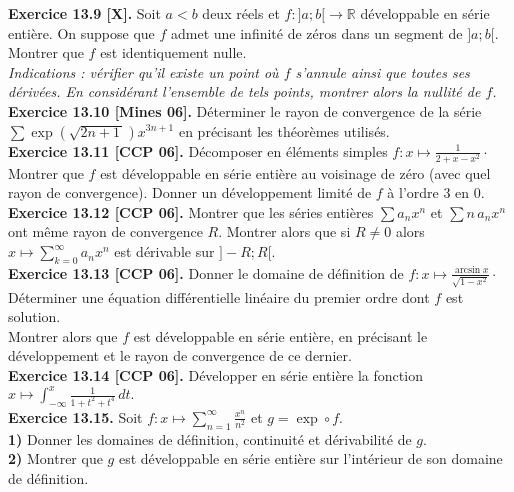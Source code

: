 \documentclass[a4paper,12pt,francais]{article}
\newcommand{\field}[1]{\mathbb{#1}}
\newcommand{\R}{\field{R}}
\begin{document}
\noindent
{\bf Exercice 13.9 [X].} Soit $a<b$ deux réels et $f:]a;b[\rightarrow \R$ développable en série entière. On suppose que $f$
      admet une infinité de zéros dans un segment de $]a;b[$. Montrer
      que $f$ est identiquement nulle.\\
{\it Indications : vérifier qu'il existe un point où $f$ s'annule
  ainsi que toutes ses dérivées. En considérant l'ensemble de tels
  points, montrer alors la nullité de $f$.}\\

\noindent
{\bf Exercice 13.10 [Mines 06].} Déterminer le rayon de convergence de
la série $\displaystyle \sum \exp(\sqrt{2n+1\,}) x^{3n+1}$ en
précisant les théorèmes utilisés.\\

\noindent
{\bf Exercice 13.11 [CCP 06].} Décomposer en éléments simples
$f:x\mapsto \frac{1}{2+x-x^2}\cdot$ Montrer que $f$ est développable
en série entière au voisinage de zéro (avec quel rayon de
convergence). Donner un développement limité de $f$ à l'ordre $3$ en
$0$.\\
 
\noindent
{\bf Exercice 13.12 [CCP 06].} Montrer que les séries entières $\sum
a_n x^n$ et $\sum n \, a_n x^n$ ont même rayon de convergence
$R$. Montrer alors que si $R\neq 0$ alors $\displaystyle x\mapsto \sum_{k=0}^\infty
a_n x^n$ est dérivable sur $]-R;R[$.\\

\noindent
{\bf Exercice 13.13 [CCP 06].} Donner le domaine de définition de
$\displaystyle f:x\mapsto \frac{\arcsin x}{\sqrt{1-x^2}}\cdot$\\
Déterminer une équation différentielle linéaire du premier ordre dont
$f$ est solution.\\
Montrer alors que $f$ est développable en série entière, en précisant
le développement et le rayon de convergence de ce dernier.\\ 

\noindent
{\bf Exercice 13.14 [CCP 06].} Développer en série entière la fonction
$\displaystyle x \mapsto \int_{-\infty}^x \frac{1}{1+t^2+t^4} \, dt .$\\

\noindent
{\bf Exercice 13.15.} Soit $\displaystyle f:x\mapsto \sum_{n=1}^\infty
\frac{x^n}{n^2}$ et $g=\exp \circ f$.\\
\indent
{\bf 1)} Donner les domaines de définition, continuité et dérivabilité
de $g$.\\
\indent
{\bf 2)} Montrer que $g$ est développable en série entière sur
l'intérieur de son domaine de définition.\\
\end{document}
